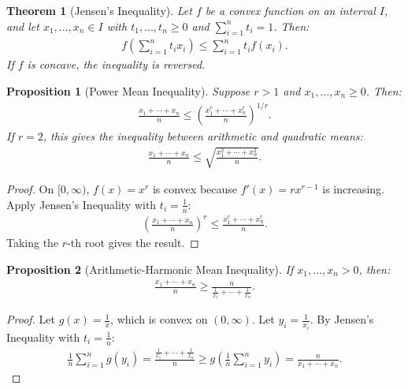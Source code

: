 \documentclass[7pt]{article}
\theoremstyle{definition}
\theoremstyle{plain}
\newtheorem{theorem}{Theorem}
\newtheorem{proposition}{Proposition}
\begin{document}
\begin{theorem}[Jensen’s Inequality]
Let $ f $ be a convex function on an interval $ I $, and let $ x_1, \ldots, x_n \in I $ with $ t_1, \ldots, t_n \geq 0 $ and $ \sum_{i=1}^n t_i = 1 $. Then:
\begin{align}
f\left(\sum_{i=1}^n t_i x_i\right) \leq \sum_{i=1}^n t_i f(x_i).
\end{align}
If $ f $ is concave, the inequality is reversed.
\end{theorem}

\begin{proposition}[Power Mean Inequality]
Suppose $ r > 1 $ and $ x_1, \ldots, x_n \geq 0 $. Then:
\begin{align}
\frac{x_1 + \cdots + x_n}{n} \leq \left(\frac{x_1^r + \cdots + x_n^r}{n}\right)^{1/r}.
\end{align}
If $ r = 2 $, this gives the inequality between arithmetic and quadratic means:
\begin{align}
\frac{x_1 + \cdots + x_n}{n} \leq \sqrt{\frac{x_1^2 + \cdots + x_n^2}{n}}.
\end{align}
\end{proposition}

\begin{proof}
On $ [0, \infty) $, $ f(x) = x^r $ is convex because $ f'(x) = rx^{r-1} $ is increasing. Apply Jensen’s Inequality with $ t_i = \frac{1}{n} $:
\begin{align}
\left(\frac{x_1 + \cdots + x_n}{n}\right)^r \leq \frac{x_1^r + \cdots + x_n^r}{n}.
\end{align}
Taking the $ r $-th root gives the result.
\end{proof}

\begin{proposition}[Arithmetic-Harmonic Mean Inequality]
If $ x_1, \ldots, x_n > 0 $, then:
\begin{align}
\frac{x_1 + \cdots + x_n}{n} \geq \frac{n}{\frac{1}{x_1} + \cdots + \frac{1}{x_n}}.
\end{align}
\end{proposition}

\begin{proof}
Let $ g(x) = \frac{1}{x} $, which is convex on $ (0, \infty) $. Let $ y_i = \frac{1}{x_i} $. By Jensen’s Inequality with $ t_i = \frac{1}{n} $:
\begin{align}
\frac{1}{n} \sum_{i=1}^n g(y_i) = \frac{\frac{1}{x_1} + \cdots + \frac{1}{x_n}}{n} \geq g\left(\frac{1}{n} \sum_{i=1}^n y_i\right) = \frac{n}{x_1 + \cdots + x_n}.
\end{align}
\end{proof}
\end{document}
